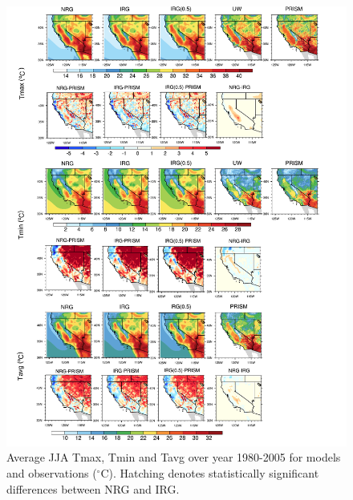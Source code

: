 \documentclass[draft,ms]{agutex}   %
\begin{document}
\begin{figure}
\begin{center}
\includegraphics[width=6in]{irrig_2dplot.pdf}
\caption{Average JJA Tmax, Tmin and Tavg over year 1980-2005 for models and observations ($^\circ$C). Hatching denotes statistically significant differences between NRG and IRG.}
\label{fig:Figure 3}
\end{center}
\end{figure}
\end{document}
